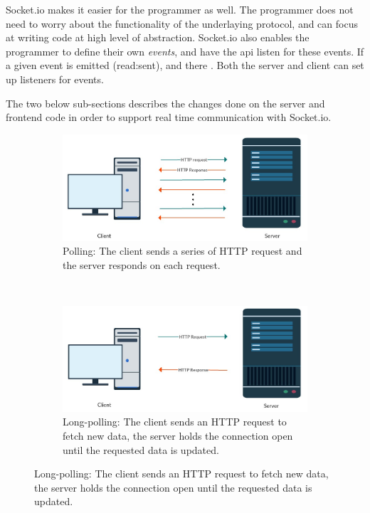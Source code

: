 Socket.io makes it easier for the programmer as well. The programmer does not need to worry about the functionality of the underlaying protocol, and can focus at writing code at high level of abstraction. Socket.io also enables the programmer to define their own \textit{events}, and have the \gls{api} listen for these events. If a given event is emitted (read:sent), and there . Both the server and client can set up listeners for events.

The two below sub-sections describes the changes done on the server and frontend code in order to support real time communication with Socket.io.

\begin{figure}
    \centering
    \begin{subfigure}[b]{1.0\textwidth}
        \includegraphics[width=\textwidth]{figs/polling.jpg}
        \caption{Polling: The client sends a series of HTTP request and the server responds on each request.}
        \label{fig:polling}
    \end{subfigure}
    ~ %
    \begin{subfigure}[b]{1.0\textwidth}
        \includegraphics[width=\textwidth]{figs/long_polling.jpg}
        \caption{Long-polling: The client sends an HTTP request to fetch new data, the server holds the connection open until the requested data is updated.}

\end{subfigure}
\end{figure}
